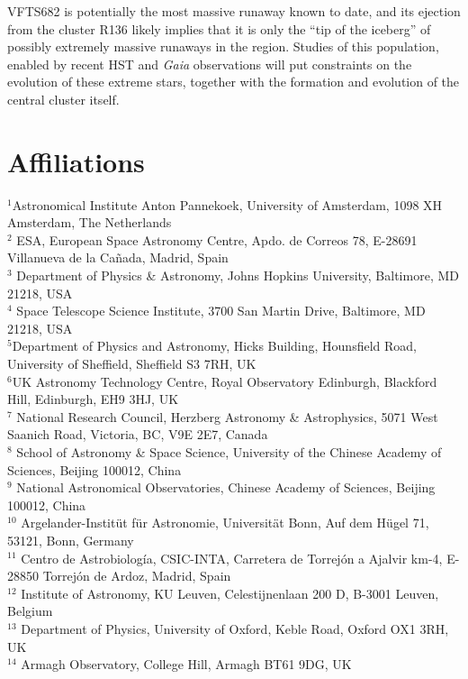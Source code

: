 \documentclass[apjl,twocolumn]{emulateapj}
\begin{document}
VFTS682 is potentially the most massive runaway known to date, and its ejection
from the cluster R136 likely implies that it is only the ``tip of the
iceberg'' of possibly extremely massive runaways in the
region. Studies of this population, enabled by recent HST and \emph{Gaia} observations will put constraints on the evolution
of these extreme stars, together with the formation and evolution of
the central cluster itself.



 
 

\section*{Affiliations}
\noindent $^{1}${Astronomical Institute Anton Pannekoek, University of
    Amsterdam, 1098 XH Amsterdam, The Netherlands} \\
  $^{2}$ {ESA, European Space Astronomy Centre, Apdo. de Correos 78,
    E-28691 Villanueva de la Ca\~nada, Madrid, Spain} \\
 $^{3}$ {
 Department of Physics \& Astronomy, Johns Hopkins University, Baltimore, MD 21218, USA}\\
  $^{4}$ {Space Telescope Science Institute, 3700 San Martin Drive,
    Baltimore, MD 21218, USA}\\
  $^{5}${Department of Physics and Astronomy, Hicks Building,
    Hounsfield Road, University of Sheffield, Sheffield S3 7RH, UK}\\
  $^{6}${UK Astronomy Technology Centre, Royal Observatory Edinburgh, Blackford Hill, Edinburgh, EH9 3HJ, UK}\\
  $^{7}$ {National Research Council, Herzberg Astronomy \&
    Astrophysics, 5071 West Saanich Road, Victoria, BC, V9E 2E7,
    Canada}\\
  $^{8}$ {School of Astronomy \& Space Science, University of the Chinese
    Academy of Sciences, Beijing 100012, China}\\
  $^{9}$ {National Astronomical Observatories, Chinese Academy of
    Sciences, Beijing 100012, China}\\
  $^{10}$ {Argelander-Instit\"ut f\"ur Astronomie, Universit\"at Bonn,
    Auf dem H\"ugel 71, 53121, Bonn, Germany}\\
  $^{11}$ {Centro de Astrobiología, CSIC-INTA, Carretera de Torrejón a Ajalvir km-4, E-28850 Torrejón de Ardoz, Madrid, Spain}\\
  $^{12}$ {Institute of Astronomy, KU Leuven, Celestijnenlaan 200 D, B-3001 Leuven, Belgium}\\
  $^{13}$ {Department of Physics, University of Oxford, Keble Road,
    Oxford OX1 3RH, UK} \\
  $^{14}$ {Armagh Observatory, College Hill, Armagh BT61 9DG, UK}\\
\end{document}
